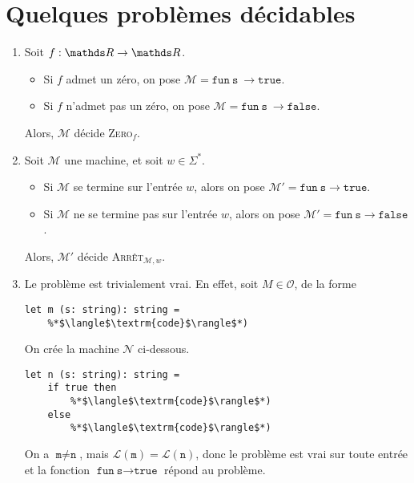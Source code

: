 \section{Quelques problèmes décidables}

\begin{enumerate}
	\item Soit $f : \R \to \R$.
		\begin{itemize}
			\item Si $f$\/ admet un zéro, on pose $\mathcal{M} = \texttt{fun}\ \texttt{s}\ \to \texttt{true}$.
			\item Si $f$\/ n'admet pas un zéro, on pose $\mathcal{M} = \texttt{fun}\ \texttt{s}\ \to \texttt{false}$.
		\end{itemize}
		Alors, $\mathcal{M}$\/ décide \textsc{Zero}$_f$.
	\item Soit $\mathcal{M}$\/ une machine, et soit $w \in \Sigma^*$.
		\begin{itemize}
			\item Si $\mathcal{M}$\/ se termine sur l'entrée $w$, alors on pose $\mathcal{M}' = \texttt{fun}\ \texttt{s} \to \texttt{true}$.
			\item Si $\mathcal{M}$\/ ne se termine pas sur l'entrée $w$, alors on pose $\mathcal{M}' = \texttt{fun}\ \texttt{s} \to \texttt{false}$.
		\end{itemize}
		Alors, $\mathcal{M}'$\/ décide \textsc{Arrêt}$_{\mathcal{M},w}$.
	\item Le problème est trivialement vrai. En effet, soit $M \in \mathcal{O}$, de la forme
		\begin{lstlisting}[language=caml]
let m (s: string): string =
	%*$\langle$\textrm{code}$\rangle$*) 
		\end{lstlisting}
		On crée la machine $\mathcal{N}$\/ ci-dessous.
		\begin{lstlisting}[language=caml]
let n (s: string): string =
	if true then
		%*$\langle$\textrm{code}$\rangle$*) 
	else
		%*$\langle$\textrm{code}$\rangle$*) 
		\end{lstlisting}
		On a $\texttt{m} \neq \texttt{n}$, mais $\mathcal{L}(\texttt{m}) = \mathcal{L}(\texttt{n})$, donc le problème est vrai sur toute entrée et la fonction $\texttt{fun}\ \texttt{s} \to \texttt{true}$\/ répond au problème.
\end{enumerate}
